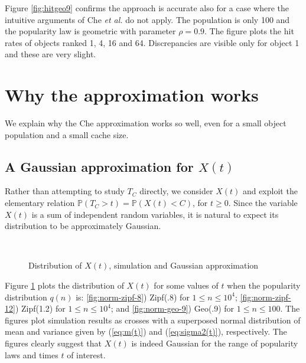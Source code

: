 \documentclass{amsart}
\def\P{{\mathbb P}}
\def\etal{{\em et al. }}
\begin{document}
Figure \ref{fig:hitgeo9} confirms the approach is accurate also for a case where the intuitive arguments of Che \etal  do not apply. The population is only 100 and the popularity law is geometric with parameter $\rho=0.9$. The figure plots the hit rates of objects ranked 1, 4, 16 and 64. Discrepancies are visible only for object 1 and these are very slight.

    



\section{Why the approximation works}
\label{sec:whyitworks}
We explain why the Che approximation works so well, even for a small object population and a small cache size.


\subsection{A Gaussian approximation for $X(t)$}
Rather than attempting to study $T_C$ directly, we consider $X(t)$ and exploit the  elementary relation $\P(T_C>t)= \P(X(t)<C)$, for $t\geq 0$. Since  the variable $X(t)$ is a sum of independent random variables,  it is natural to expect its distribution to be approximately Gaussian.  




\begin{figure}
\     \vspace{-8mm}\hspace{-2cm}
 \\ 
   \caption{Distribution of $X(t)$, simulation and Gaussian approximation}
         \vspace{-5mm}

     \label{fig:normal}
\end{figure}


Figure \ref{fig:normal}  plots the distribution of $X(t)$ for some values of $t$ when the popularity distribution $q(n)$ is: \ref{fig:norm-zipf-8})  Zipf(.8) for $1\le n\le 10^4$; \ref{fig:norm-zipf-12}) Zipf(1.2) for $1\le n\le 10^4$; and \ref{fig:norm-geo-9}) Geo(.9) for $1\le n\le 100$. The figures plot simulation results as crosses with a superposed normal distribution of mean and variance given by (\ref{eq:m(t)}) and (\ref{eq:sigma2(t)}), respectively. The figures clearly suggest that $X(t)$ is indeed Gaussian for the range of popularity laws and times $t$ of interest. 
\end{document}
